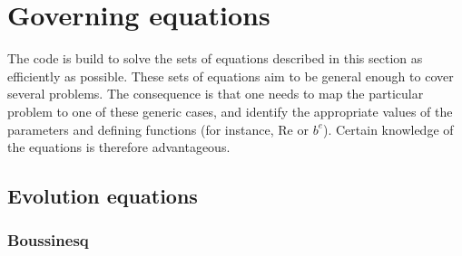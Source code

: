 \def\pt{\partial_t}
\def\psi{\partial_i}
\def\pk{\partial_k}

\def\Re{\mathrm{Re}}
\def\Pr{\mathrm{Pr}}
\def\Sc{\mathrm{Sc}}
\def\Fr{\mathrm{Fr}}
\def\Ro{\mathrm{Ro}}

\def\j{\mathbf{j}}
\def\e{\mathbf{e}}

\def\ref{_\mathrm{bg}}
\def\ss{_\mathrm{s}}
\def\sc{_\mathrm{c}}

\chapter{Governing equations}\label{sec:equations}

The code is build to solve the sets of equations described in this section as efficiently as possible. These sets of equations aim to be general enough to cover several problems. The consequence is that one needs to map the particular problem to one of these generic cases, and identify the appropriate values of the parameters and defining functions (for instance, $\Re$ or $b^e$). Certain knowledge of the equations is therefore advantageous.

\section{Evolution equations}

\subsection{Boussinesq}

